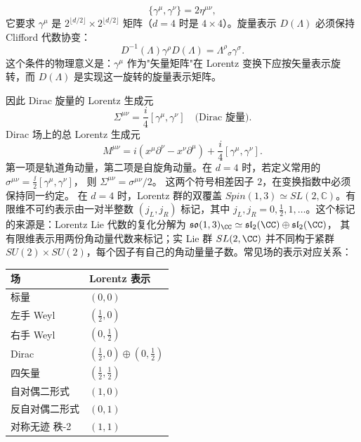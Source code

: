 \begin{equation*}\boxed{\{\gamma^\mu,\gamma^\nu\}=2\eta^{\mu\nu},}
\end{equation*}
它要求 $\gamma^\mu$ 是 $2^{\lfloor d/2\rfloor}\times 2^{\lfloor d/2\rfloor}$ 矩阵（$d=4$ 时是 $4\times4$）。旋量表示 $D(\Lambda)$ 必须保持 Clifford 代数协变：
\begin{equation}\label{eq:ms-poincare-clifford-cov}
D^{-1}(\Lambda)\gamma^\rho D(\Lambda)=\Lambda^\rho{}_\sigma\gamma^\sigma.
\end{equation}
这个条件的物理意义是：$\gamma^\mu$ 作为"矢量矩阵"在 Lorentz 变换下应按矢量表示旋转，而 $D(\Lambda)$ 是实现这一旋转的旋量表示矩阵。

因此 Dirac 旋量的 Lorentz 生成元
\begin{equation}\label{eq:ms-poincare-Sigma-dirac}
\boxed{\Sigma^{\mu\nu}=\frac{i}{4}[\gamma^\mu,\gamma^\nu]\quad\text{(Dirac 旋量)}.}
\end{equation}
Dirac 场上的总 Lorentz 生成元
\begin{equation*}\boxed{
M^{\mu\nu}=i(x^\mu\partial^\nu-x^\nu\partial^\mu)+\frac{i}{4}[\gamma^\mu,\gamma^\nu].
}
\end{equation*}
第一项是轨道角动量，第二项是自旋角动量。在 $d=4$ 时，若定义常用的
$\sigma^{\mu\nu}=\frac{\ii}{2}[\gamma^\mu,\gamma^\nu]$，
则 $\Sigma^{\mu\nu}=\sigma^{\mu\nu}/2$。
这两个符号相差因子 $2$，在变换指数中必须保持同一约定。
在 $d=4$ 时，Lorentz 群的双覆盖 $Spin(1,3)\simeq SL(2,\mathbb{C})$。有限维不可约表示由一对半整数 $(j_L,j_R)$ 标记，其中 $j_L,j_R=0,\frac{1}{2},1,\ldots$。这个标记的来源是：Lorentz Lie 代数的复化分解为
$\mathfrak{so}(1,3)_\CC\simeq\mathfrak{sl}_2(\CC)\oplus\mathfrak{sl}_2(\CC)$，
其有限维表示用两份角动量代数来标记；实 Lie 群 $SL(2,\CC)$
并不同构于紧群 $SU(2)\times SU(2)$，每个因子有自己的角动量量子数。常见场的表示对应关系：

\begin{center}
\begin{tabular}{ll}
\hline
场 & Lorentz 表示 \\
\hline
标量 & $(0,0)$ \\
左手 Weyl & $(\frac{1}{2},0)$ \\
右手 Weyl & $(0,\frac{1}{2})$ \\
Dirac & $(\frac{1}{2},0)\oplus(0,\frac{1}{2})$ \\
四矢量 & $(\frac{1}{2},\frac{1}{2})$ \\
自对偶二形式 & $(1,0)$ \\
反自对偶二形式 & $(0,1)$ \\
对称无迹 秩-2 & $(1,1)$ \\
\hline
\end{tabular}
\end{center}

